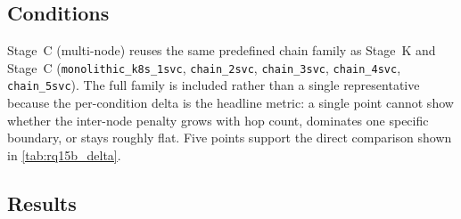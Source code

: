 \subsection{Conditions}

Stage~C (multi-node) reuses the same predefined chain family as Stage~K and Stage~C
(\texttt{monolithic\_k8s\_1svc}, \texttt{chain\_2svc}, \texttt{chain\_3svc},
\texttt{chain\_4svc}, \texttt{chain\_5svc}). The full family is included rather than
a single representative because the per-condition delta is the headline metric: a
single point cannot show whether the inter-node penalty grows with hop count,
dominates one specific boundary, or stays roughly flat. Five points support the
direct comparison shown in \cref{tab:rq15b_delta}.

\subsection{Results}

\begin{table}[ht]
\centering
\caption[Stage~C (multi-node) AKS latency and overhead summary]{Stage~C (multi-node) AKS summary of mean latency and overhead vs.\ the AKS multi-node monolithic baseline. Source: \texttt{merged\_results/condition\_summaries.csv} in \texttt{rq1\_5b\_multinode\_20260515\_152628}.}
\label{tab:rq15b_results}
\end{table}

